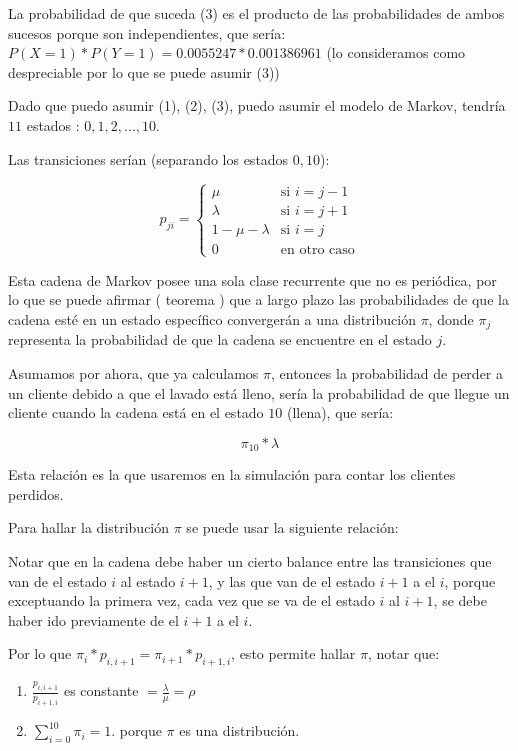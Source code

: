 \documentclass[14pt]{extarticle}
\begin{document}
La probabilidad de que suceda (3) es el producto de las probabilidades de ambos sucesos porque son independientes, que sería: $P( X = 1) * P( Y = 1) = 0.0055247 * 0.001386961$ (lo consideramos como despreciable por lo que se puede asumir (3))
	
Dado que puedo asumir (1), (2), (3), puedo asumir el modelo de Markov, tendría $11$ estados : ${0, 1, 2, ..., 10}$.

Las transiciones serían (separando los estados $0, 10$):

$$
p_{ji} = \begin{cases}
  \mu  & \text{si $i = j-1$} \\
  \lambda  & \text{si $i = j+1$} \\
  1 - \mu  - \lambda  & \text{si $i = j$} \\
  0 & \text{en otro caso}
        \end{cases}
$$

Esta cadena de Markov posee una sola clase recurrente que no es periódica, por lo que se puede afirmar ( teorema ) que a largo plazo las probabilidades de que la cadena esté en un estado específico convergerán a una distribución $\pi$, donde $\pi_j$ representa la probabilidad de que la cadena se encuentre en el estado $j$. 

Asumamos por ahora, que ya calculamos $\pi$, entonces la probabilidad de perder a un cliente debido a que el lavado está lleno, sería la probabilidad de que llegue un cliente cuando la cadena está en el estado $10$ (llena), que sería:

$$\pi_{10} * \lambda $$

Esta relación es la que usaremos en la simulación para contar los clientes perdidos.

Para hallar la distribución $\pi$ se puede usar la siguiente relación:

Notar que en la cadena debe haber un cierto balance entre las transiciones que van de el estado $i$ al estado $i+1$, y las que van de el estado $i+1$ a el $i$, porque exceptuando la primera vez, cada vez que se va de el estado $i$ al $i+1$, se debe haber ido previamente de el $i+1$ a el $i$.

Por lo que $\pi_i * p_{i, i+1} = \pi_{i+1} * p_{i+1, i}$, esto permite hallar $\pi$, notar que:

\begin{enumerate}
    \item $\frac{p_{i, i+1}}{p_{i+1, i}}$ es constante $= \frac{ \lambda}{ \mu}  = \rho$
    \item $\sum_{i = 0}^{10} \pi_i = 1$. porque $\pi$ es una distribución.
\end{enumerate}
\end{document}

